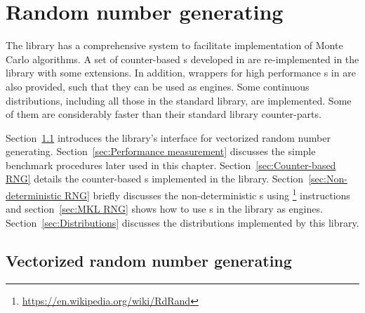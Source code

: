 \chapter{Random number generating}
\label{chap:Random number generating}

The library has a comprehensive \rng system to facilitate implementation of
Monte Carlo algorithms. A set of counter-based \rng{}s developed in
\textcite{Salmon:2011um} are re-implemented in the library with some
extensions. In addition, wrappers for high performance \rng{}s in \mkl are also
provided, such that they can be used as \cppoo \rng engines. Some continuous
distributions, including all those in the standard library, are implemented.
Some of them are considerably faster than their standard library counter-parts.

Section~\ref{sec:Vectorized random number generating} introduces the library's
interface for vectorized random number generating. Section~\ref{sec:Performance
  measurement} discusses the simple benchmark procedures later used in this
chapter. Section~\ref{sec:Counter-based RNG} details the counter-based \rng{}s
implemented in the library. Section~\ref{sec:Non-deterministic RNG} briefly
discusses the non-deterministic \rng{}s using
\rdrand\footnote{\url{https://en.wikipedia.org/wiki/RdRand}} instructions and
section~\ref{sec:MKL RNG} shows how to use \rng{}s in the \mkl library as
\cppoo engines. Section~\ref{sec:Distributions} discusses the distributions
implemented by this library.

\section{Vectorized random number generating}
\label{sec:Vectorized random number generating}

